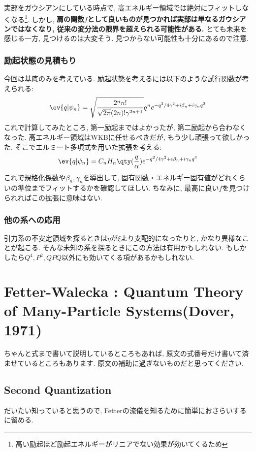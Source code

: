 \documentclass[10.5pt,a4paper]{jreport}
\begin{document}
実部をガウシアンにしている時点で, 高エネルギー領域では絶対にフィットしなくなる\footnote{高い励起ほど励起エネルギーがリニアでない効果が効いてくるため}. しかし, \textbf{肩の関数$f$として良いものが見つかれば実部は単なるガウシアンではなくなり, 従来の変分法の限界を超えられる可能性がある.} とても未来を感じる一方, 見つけるのは大変そう. 見つからない可能性も十分にあるので注意. 
\subsection{励起状態の見積もり}
今回は基底のみを考えている. 励起状態を考えるには以下のような試行関数が考えられる:
\begin{eqnarray}
  \ev{q|\psi_n} = \sqrt{\frac{2^nn!}{\sqrt{2\pi}(2n)!\gamma^{2n+1}}} q^ne^{-q^2/4\gamma^2 + i\beta_n + i\gamma_n q^3}
\end{eqnarray}
これで計算してみたところ, 第一励起まではよかったが, 第二励起から合わなくなった. 高エネルギー領域はWKBに任せるべきだが, もう少し頑張って欲しかった. そこでエルミート多項式を用いた拡張を考える:
\begin{eqnarray}
  \ev{q|\psi_n} = C_n H_n\qty(\frac{q}{\alpha})e^{-q^2/4\gamma^2 + i\beta_n + i\gamma_n q^3}
\end{eqnarray}
これで規格化係数や$\beta_n, \gamma_n$を導出して, 固有関数・エネルギー固有値がどれくらいの準位までフィットするかを確認してほしい. ちなみに, 最高に良い$f$を見つけられればこの拡張に意味はない.

\subsection{他の系への応用}
引力系の不安定領域を探るときは$\eta$が$\xi$より支配的になったりと, かなり異様なことが起こる. そんな未知の系を探るときにこの方法は有用かもしれない. もしかしたら$Q^4, P^2, QPQ$以外にも効いてくる項があるかもしれない.
\newpage
\chapter{Fetter-Walecka : Quantum Theory of Many-Particle Systems(Dover, 1971)}
ちゃんと式まで書いて説明しているところもあれば, 原文の式番号だけ書いて済ませているところもあります. 原文の補助に過ぎないものだと思ってください. 
\section{Second Quantization}
だいたい知っていると思うので, Fetterの流儀を知るために簡単におさらいするに留める.
\end{document}
